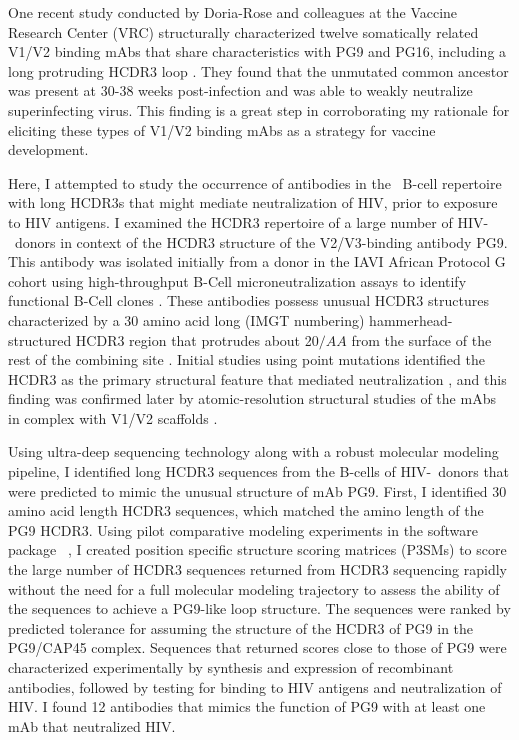One recent study conducted by Doria-Rose and colleagues at the Vaccine Research Center (VRC) structurally characterized twelve somatically related V1/V2 binding mAbs that share characteristics with PG9 and PG16, including a long protruding HCDR3 loop \citep{DoriaRose:2014ic}. They found that the unmutated common ancestor was present at 30-38 weeks post-infection and was able to weakly neutralize superinfecting virus. This finding is a great step in corroborating my rationale for eliciting these types of V1/V2 binding mAbs as a strategy for vaccine development.

Here, I attempted to study the occurrence of antibodies in the \naive~B-cell repertoire with long HCDR3s that might mediate neutralization of HIV, prior to exposure to HIV antigens. I examined the HCDR3 repertoire of a large number of HIV-\naive~donors in context of the HCDR3 structure of the V2/V3-binding antibody PG9. This antibody was isolated initially from a donor in the IAVI African Protocol G cohort using high-throughput B-Cell microneutralization assays to identify functional B-Cell clones \citep{Walker:2009cd}. These antibodies possess unusual HCDR3 structures characterized by a 30 amino acid long (IMGT numbering) hammerhead-structured HCDR3 region that protrudes about 20$/AA$ from the surface of the rest of the combining site \citep{Pancera:2010hh,Pejchal:2010fp,McLellan:2011dg}. Initial studies using point mutations identified the HCDR3 as the primary structural feature that mediated neutralization \citep{Pancera:2010hh}, and this finding was confirmed later by atomic-resolution structural studies of the mAbs in complex with V1/V2 scaffolds \citep{McLellan:2011dg,Pancera:2013ev}.

Using ultra-deep sequencing technology along with a robust molecular modeling pipeline, I identified long HCDR3 sequences from the B-cells of HIV-\naive~donors that were predicted to mimic the unusual structure of mAb PG9. First, I identified 30 amino acid length HCDR3 sequences, which matched the amino length of the PG9 HCDR3. Using pilot comparative modeling experiments in the software package \rosetta~\citep{LeaverFay:2011fc,Kaufmann:2010ea}, I created position specific structure scoring matrices (P3SMs) to score the large number of HCDR3 sequences returned from HCDR3 sequencing rapidly without the need for a full molecular modeling trajectory to assess the ability of the sequences to achieve a PG9-like loop structure. The sequences were ranked by predicted tolerance for assuming the structure of the HCDR3 of PG9 in the PG9/CAP45 complex. Sequences that returned scores close to those of PG9 were characterized experimentally by synthesis and expression of recombinant antibodies, followed by testing for binding to HIV antigens and neutralization of HIV. I found 12 antibodies that mimics the function of PG9 with at least one mAb that neutralized HIV.

